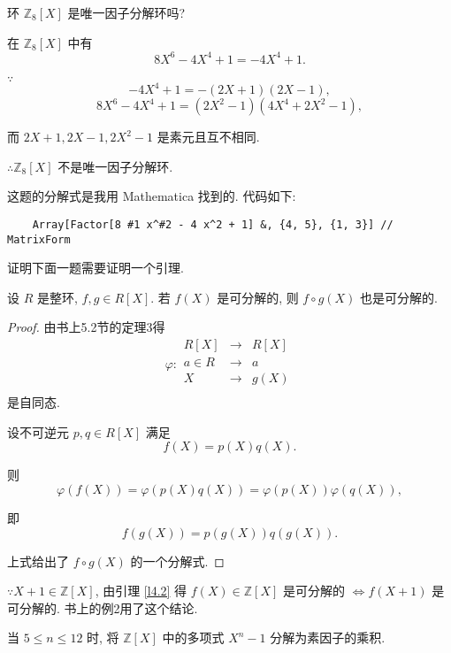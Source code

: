 \documentclass[UTF8]{ctexart}
\begin{document}
\begin{exercise}%
    环 $\mathbb{Z}_8[X]$ 是唯一因子分解环吗?
\end{exercise}
\begin{solution}
    在 $\mathbb{Z}_8[X]$ 中有
    \[8X^6-4X^4+1=-4X^4+1.\]

    $\because$
    \[-4X^4+1=-(2X+1)(2X-1),\]
    \[8X^6-4X^4+1=(2X^2-1)(4X^4+2X^2-1),\]

    而 $2X+1,2X-1,2X^2-1$ 是素元且互不相同.

    $\therefore\mathbb{Z}_8[X]$ 不是唯一因子分解环.
\end{solution}
\begin{note}
    这题的分解式是我用 Mathematica 找到的. 代码如下:
    \begin{verbatim}
    Array[Factor[8 #1 x^#2 - 4 x^2 + 1] &, {4, 5}, {1, 3}] // MatrixForm
    \end{verbatim}
\end{note}
证明下面一题需要证明一个引理.
\begin{lemma}\label{l4.2}
    设 $R$ 是整环, $f,g\in R[X]$. 若 $f(X)$ 是可分解的, 则 $f\circ g(X)$ 也是可分解的.
\end{lemma}
\begin{proof}
    由书上5.2节的定理3得
    \[\varphi:\begin{array}{rcl}
        R[X] & \to & R[X] \\
        a\in R & \to & a \\
        X & \to & g(X) \\
    \end{array}\]
    是自同态.

    设不可逆元 $p,q\in R[X]$ 满足
    \[f(X)=p(X)q(X).\]

    则
    \[\varphi(f(X))=\varphi(p(X)q(X))=\varphi(p(X))\varphi(q(X)),\]

    即
    \[f(g(X))=p(g(X))q(g(X)).\]

    上式给出了 $f\circ g(X)$ 的一个分解式.
\end{proof}
\begin{note}
    $\because X+1\in\mathbb{Z}[X]$, 由引理 \ref{l4.2} 得 $f(X)\in\mathbb{Z}[X]$ 是可分解的 $\Leftrightarrow f(X+1)$ 是可分解的. 书上的例2用了这个结论.
\end{note}
\begin{exercise}%
    当 $5\leq n\leq 12$ 时, 将 $\mathbb{Z}[X]$ 中的多项式 $X^n-1$ 分解为素因子的乘积.
\end{exercise}
\end{document}
